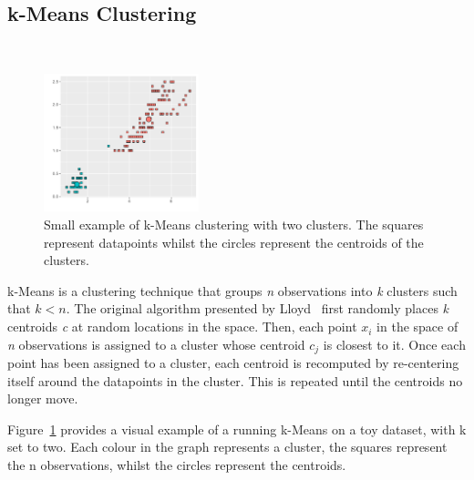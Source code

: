 \subsection{k-Means Clustering}~\label{sec:kMeans}
\vspace{-1em}
\begin{figure}[t]
    \centering
    \includegraphics[width=0.4\textwidth]{background/graphics/smallest_clust_example.pdf}
	\vspace{-1em}
    \caption{Small example of k-Means clustering with two clusters. The squares represent datapoints whilst the circles represent the centroids of the clusters.}
    \label{fig:kmeanex}
\vspace{-1em}
\end{figure}

k-Means is a clustering technique that groups \textit{n} observations into \textit{k} clusters such that $k < n$.
The original algorithm presented by Lloyd~\cite{kMeans} first randomly places \textit{k} centroids \textit{c} at random locations in the space.
Then, each point \textit{$x_{i}$} in the space of \textit{n} observations is assigned to a cluster whose centroid \textit{$c_{j}$} is closest to it.
Once each point has been assigned to a cluster, each centroid is recomputed by re-centering itself around the datapoints in the cluster.
This is repeated until the centroids no longer move.
 
Figure~\ref{fig:kmeanex} provides a visual example of a running k-Means on a toy dataset, with k set to two.
Each colour in the graph represents a cluster, the squares represent the n observations, whilst the circles represent the centroids.
\vspace{-1em}
